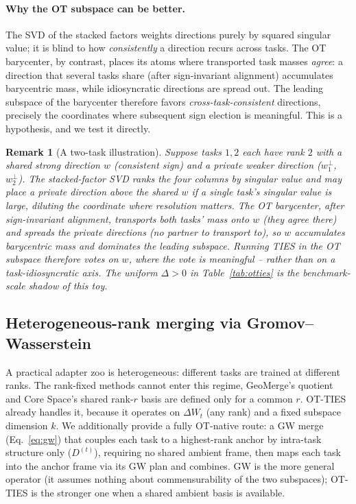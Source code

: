 \documentclass[11pt]{article}
\newtheorem{remark}{Remark}
\newcommand{\dW}{\Delta W}
\newcommand{\otties}{\textsc{OT-TIES}}
\begin{document}
\paragraph{Why the OT subspace can be better.}
The SVD of the stacked factors weights directions purely by squared singular value; it is blind to how
\emph{consistently} a direction recurs across tasks. The OT barycenter, by contrast, places its atoms
where transported task masses \emph{agree}: a direction that several tasks share (after sign-invariant
alignment) accumulates barycentric mass, while idiosyncratic directions are spread out. The leading
subspace of the barycenter therefore favors \emph{cross-task-consistent} directions, precisely the
coordinates where subsequent sign election is meaningful. This is a hypothesis, and we test it directly.

\begin{remark}[A two-task illustration]
Suppose tasks $1,2$ each have rank $2$ with a \emph{shared} strong direction $w$ (consistent sign) and a
\emph{private} weaker direction ($w_1^{\perp}$, $w_2^{\perp}$). The stacked-factor SVD ranks the four
columns by singular value and may place a private direction above the shared $w$ if a single task's
singular value is large, diluting the coordinate where resolution matters. The OT barycenter, after
sign-invariant alignment, transports both tasks' mass onto $w$ (they agree there) and \emph{spreads} the
private directions (no partner to transport to), so $w$ accumulates barycentric mass and dominates the
leading subspace. Running TIES in the OT subspace therefore votes on $w$, where the vote is meaningful
-- rather than on a task-idiosyncratic axis. The uniform $\Delta>0$ in Table~\ref{tab:otties} is the
benchmark-scale shadow of this toy.
\end{remark}

\subsection{Heterogeneous-rank merging via Gromov--Wasserstein}
\label{sec:method-gw}
A practical adapter zoo is heterogeneous: different tasks are trained at different ranks. The rank-fixed
methods cannot enter this regime, GeoMerge's quotient and Core Space's shared rank-$r$ basis are
defined only for a common $r$. \otties{} already handles it, because it operates on $\dW_t$ (any rank)
and a fixed subspace dimension $k$. We additionally provide a fully OT-native route: a GW merge
(Eq.~\eqref{eq:gw}) that couples each task to a highest-rank anchor by intra-task structure only
($D^{(t)}$), requiring no shared ambient frame, then maps each task into the anchor frame via its GW plan
and combines. GW is the more general operator (it assumes nothing about commensurability of the two
subspaces); \otties{} is the stronger one when a shared ambient basis is available.
\end{document}
